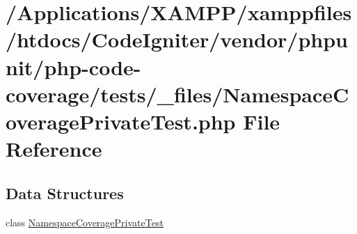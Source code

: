 \hypertarget{php-code-coverage_2tests_2__files_2_namespace_coverage_private_test_8php}{}\section{/\+Applications/\+X\+A\+M\+P\+P/xamppfiles/htdocs/\+Code\+Igniter/vendor/phpunit/php-\/code-\/coverage/tests/\+\_\+files/\+Namespace\+Coverage\+Private\+Test.php File Reference}
\label{php-code-coverage_2tests_2__files_2_namespace_coverage_private_test_8php}
\subsection*{Data Structures}
\begin{DoxyCompactItemize}
\item 
class \mbox{\hyperlink{class_namespace_coverage_private_test}{Namespace\+Coverage\+Private\+Test}}
\end{DoxyCompactItemize}
